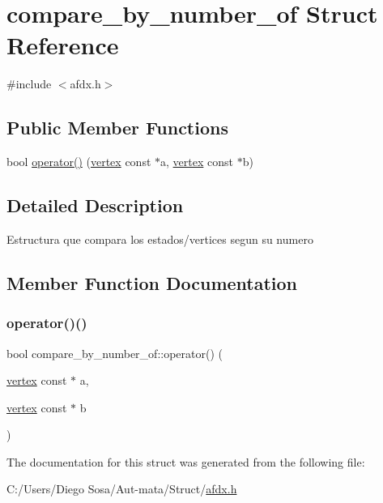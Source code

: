 \hypertarget{structcompare__by__number__of}{}\section{compare\+\_\+by\+\_\+number\+\_\+of Struct Reference}
\label{structcompare__by__number__of}


{\ttfamily \#include $<$afdx.\+h$>$}

\subsection*{Public Member Functions}
\begin{DoxyCompactItemize}
\item 
bool \hyperlink{structcompare__by__number__of_aece99044692df991bf174f5c5176b0d1}{operator()} (\hyperlink{structvertex}{vertex} const $\ast$a, \hyperlink{structvertex}{vertex} const $\ast$b)
\end{DoxyCompactItemize}


\subsection{Detailed Description}
Estructura que compara los estados/vertices segun su numero 

\subsection{Member Function Documentation}
\hypertarget{structcompare__by__number__of_aece99044692df991bf174f5c5176b0d1}{}\label{structcompare__by__number__of_aece99044692df991bf174f5c5176b0d1} 
\subsubsection{\texorpdfstring{operator()()}{operator()()}}
{\footnotesize\ttfamily bool compare\+\_\+by\+\_\+number\+\_\+of\+::operator() (\begin{DoxyParamCaption}\item[{\hyperlink{structvertex}{vertex} const $\ast$}]{a,  }\item[{\hyperlink{structvertex}{vertex} const $\ast$}]{b }\end{DoxyParamCaption})\hspace{0.3cm}{\ttfamily [inline]}}



The documentation for this struct was generated from the following file\+:\begin{DoxyCompactItemize}
\item 
C\+:/\+Users/\+Diego Sosa/\+Aut-\/mata/\+Struct/\hyperlink{afdx_8h}{afdx.\+h}\end{DoxyCompactItemize}

